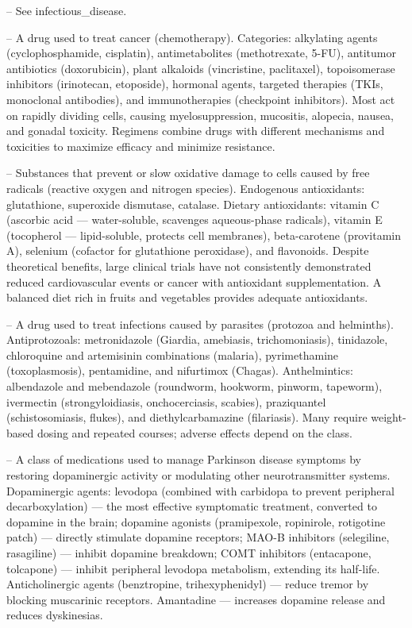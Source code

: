 -- See infectious\_disease.

-- A drug used to treat cancer (chemotherapy). Categories: alkylating agents (cyclophosphamide, cisplatin), antimetabolites (methotrexate, 5-FU), antitumor antibiotics (doxorubicin), plant alkaloids (vincristine, paclitaxel), topoisomerase inhibitors (irinotecan, etoposide), hormonal agents, targeted therapies (TKIs, monoclonal antibodies), and immunotherapies (checkpoint inhibitors). Most act on rapidly dividing cells, causing myelosuppression, mucositis, alopecia, nausea, and gonadal toxicity. Regimens combine drugs with different mechanisms and toxicities to maximize efficacy and minimize resistance.

-- Substances that prevent or slow oxidative damage to cells caused by free radicals (reactive oxygen and nitrogen species). Endogenous antioxidants: glutathione, superoxide dismutase, catalase. Dietary antioxidants: vitamin C (ascorbic acid — water-soluble, scavenges aqueous-phase radicals), vitamin E (tocopherol — lipid-soluble, protects cell membranes), beta-carotene (provitamin A), selenium (cofactor for glutathione peroxidase), and flavonoids. Despite theoretical benefits, large clinical trials have not consistently demonstrated reduced cardiovascular events or cancer with antioxidant supplementation. A balanced diet rich in fruits and vegetables provides adequate antioxidants.

-- A drug used to treat infections caused by parasites (protozoa and helminths). Antiprotozoals: metronidazole (Giardia, amebiasis, trichomoniasis), tinidazole, chloroquine and artemisinin combinations (malaria), pyrimethamine (toxoplasmosis), pentamidine, and nifurtimox (Chagas). Anthelmintics: albendazole and mebendazole (roundworm, hookworm, pinworm, tapeworm), ivermectin (strongyloidiasis, onchocerciasis, scabies), praziquantel (schistosomiasis, flukes), and diethylcarbamazine (filariasis). Many require weight-based dosing and repeated courses; adverse effects depend on the class.

-- A class of medications used to manage Parkinson disease symptoms by restoring dopaminergic activity or modulating other neurotransmitter systems. Dopaminergic agents: levodopa (combined with carbidopa to prevent peripheral decarboxylation) — the most effective symptomatic treatment, converted to dopamine in the brain; dopamine agonists (pramipexole, ropinirole, rotigotine patch) — directly stimulate dopamine receptors; MAO-B inhibitors (selegiline, rasagiline) — inhibit dopamine breakdown; COMT inhibitors (entacapone, tolcapone) — inhibit peripheral levodopa metabolism, extending its half-life. Anticholinergic agents (benztropine, trihexyphenidyl) — reduce tremor by blocking muscarinic receptors. Amantadine — increases dopamine release and reduces dyskinesias.

